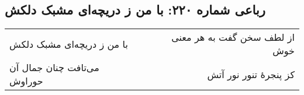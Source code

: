 \begin{center}
\section*{رباعی شماره ۲۲۰: با من ز دریچه‌ای مشبک دلکش}
\label{sec:sh220}
\begin{longtable}{l p{0.5cm} r}
با من ز دریچه‌ای مشبک دلکش
&&
از لطف سخن گفت به هر معنی خوش
\\
می‌تافت چنان جمال آن حوراوش
&&
کز پنجرهٔ تنور نور آتش
\\
\end{longtable}
\end{center}
